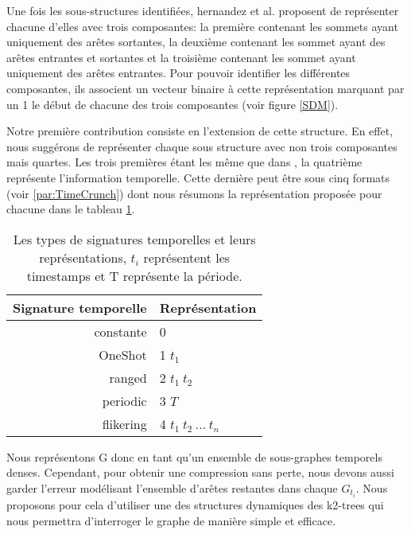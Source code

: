 \documentclass[a4paper,oneside,12pt]{report}
\theoremstyle{definition}
\begin{document}
			Une fois les sous-structures identifiées, hernandez et al. \citep{hernandez2014compressed} proposent de représenter chacune d'elles avec trois composantes: la première contenant les sommets ayant uniquement des arêtes sortantes, la deuxième contenant les sommet ayant des arêtes entrantes et sortantes et la troisième contenant les sommet ayant uniquement des arêtes entrantes. Pour pouvoir identifier les différentes composantes, ils associent un vecteur binaire à cette représentation marquant par un 1 le début de chacune des trois composantes (voir figure \ref{SDM}).
			
			Notre première contribution consiste en l'extension de cette structure. En effet, nous suggérons de représenter chaque sous structure avec non trois composantes mais quartes. Les trois premières étant les même que dans \citep{hernandez2014compressed}, la quatrième représente l'information temporelle. Cette dernière peut être sous cinq formats (voir \ref{par:TimeCrunch}) dont nous résumons la représentation proposée pour chacune dans le tableau \ref{tab:signtmp}.
			
			\begin{table}[h]
			\label{tab:signtmp}
			\begin{center}
			\begin{tabular}{|r|l|}
			\hline Signature temporelle & Représentation	
			\\\hline constante & 0	
			
			\\\hline OneShot & 1 $t_{1}$	
			
			\\\hline ranged & 2	$t_{1}\ t_{2}$	
			
			\\\hline periodic & 3  $T$	
			
			\\\hline flikering & 4 $t_{1}\ t_{2}\ ...\ t_{n}$	
			
			\\\hline			
			\end{tabular}
			\end{center}
			
			 \caption{\small {Les types de signatures temporelles et leurs représentations, $t_{i}$	 représentent les timestamps et T représente la période.}}
			\end{table}
			
			Nous représentons G donc en tant qu'un ensemble de sous-graphes temporels denses. Cependant, pour obtenir une compression sans perte, nous devons aussi garder l'erreur modélisant l'ensemble d'arêtes restantes dans chaque $G_{t_{i}}$. Nous proposons pour cela d'utiliser une des structures dynamiques des k2-trees qui nous permettra d'interroger le graphe de manière simple et efficace.
			
\end{document}
